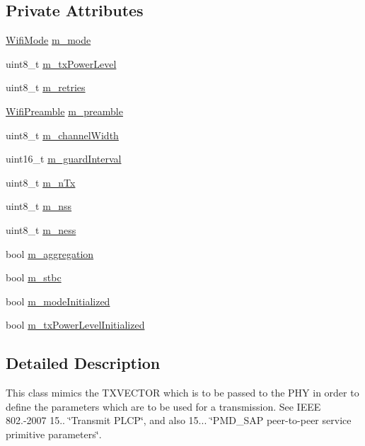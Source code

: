 \subsection*{Private Attributes}
\begin{DoxyCompactItemize}
\item 
\hyperlink{classns3_1_1WifiMode}{Wifi\+Mode} \hyperlink{classns3_1_1WifiTxVector_a3ae4a97ae1c95a7b7d6daed7ddf5a8b7}{m\+\_\+mode}
\item 
uint8\+\_\+t \hyperlink{classns3_1_1WifiTxVector_a771bae5fd1bd8f8df1f0b172946e9469}{m\+\_\+tx\+Power\+Level}
\item 
uint8\+\_\+t \hyperlink{classns3_1_1WifiTxVector_a4385bff218d8d930fd9ba8f59523d8c2}{m\+\_\+retries}
\item 
\hyperlink{group__wifi_ga5e94a56cb338a14ffbbb19c6a41251eb}{Wifi\+Preamble} \hyperlink{classns3_1_1WifiTxVector_ad53c8038c1039f47e8a1c3ab45d4454f}{m\+\_\+preamble}
\item 
uint8\+\_\+t \hyperlink{classns3_1_1WifiTxVector_a64807de9a9e72aff0324aec39620e517}{m\+\_\+channel\+Width}
\item 
uint16\+\_\+t \hyperlink{classns3_1_1WifiTxVector_a7e9c3a2abd97107113647e67332d0585}{m\+\_\+guard\+Interval}
\item 
uint8\+\_\+t \hyperlink{classns3_1_1WifiTxVector_a6b5cc1cdfe19d4f7657e76fb9b771bd4}{m\+\_\+n\+Tx}
\item 
uint8\+\_\+t \hyperlink{classns3_1_1WifiTxVector_a83ab70bae9e8a33ef044b37c440c2475}{m\+\_\+nss}
\item 
uint8\+\_\+t \hyperlink{classns3_1_1WifiTxVector_aeed6afcab5dabe7c72be58fb9b2c5a37}{m\+\_\+ness}
\item 
bool \hyperlink{classns3_1_1WifiTxVector_a14210b7439931b4c56f87e12356a1a5a}{m\+\_\+aggregation}
\item 
bool \hyperlink{classns3_1_1WifiTxVector_a8095c19f9f243d9376a6eb154fdc1c12}{m\+\_\+stbc}
\item 
bool \hyperlink{classns3_1_1WifiTxVector_ae9b3585e860df26a5c87cfaa4f3275be}{m\+\_\+mode\+Initialized}
\item 
bool \hyperlink{classns3_1_1WifiTxVector_a44a71d5caa2888c951d0b487a9e79145}{m\+\_\+tx\+Power\+Level\+Initialized}
\end{DoxyCompactItemize}


\subsection{Detailed Description}
This class mimics the T\+X\+V\+E\+C\+T\+OR which is to be passed to the P\+HY in order to define the parameters which are to be used for a transmission. See I\+E\+EE 802.-\/2007 15.. \char`\"{}\+Transmit P\+L\+C\+P\char`\"{}, and also 15... \char`\"{}\+P\+M\+D\+\_\+\+S\+A\+P peer-\/to-\/peer service primitive
parameters\char`\"{}.

